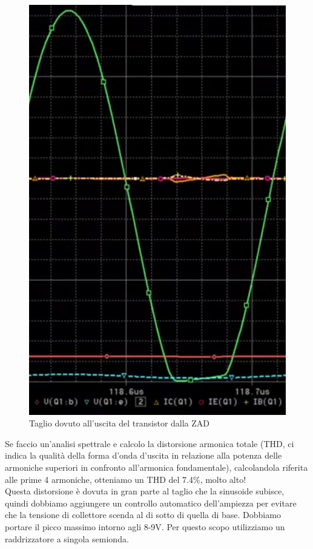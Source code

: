 \documentclass{article}
\begin{document}
~\begin{figure}[H]
\includegraphics[scale=0.5]{SimulazioneTaglio.png}
\centering
\caption{Taglio dovuto all'uscita del transistor dalla ZAD}
\label{fig:foo}
\end{figure}
Se faccio un'analisi spettrale e calcolo la distorsione armonica totale (THD, ci indica la qualità della forma d'onda d'uscita in relazione alla potenza delle armoniche superiori in confronto all'armonica fondamentale), calcolandola riferita alle prime 4 armoniche, otteniamo un THD del 7.4\%, molto alto!\\
Questa distorsione è dovuta in gran parte al taglio che la sinusoide subisce, quindi dobbiamo aggiungere un controllo automatico dell'ampiezza per evitare che la tensione di collettore scenda al di sotto di quella di base.
Dobbiamo portare il picco massimo intorno agli 8-9V. Per questo scopo utilizziamo un raddrizzatore a singola semionda.
\end{document}
